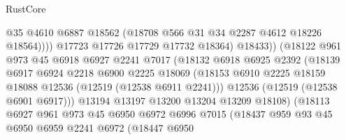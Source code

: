 \begin{lexlean}{RustCore}
\begin{coremodule}
                                        @35
                                        @4610
                                        @6887
                                        @18562
                                        (@18708 @566 @31 @34 @2287 @4612 @18226 @18564))))
                                  @17723
                                  @17726
                                  @17729
                                  @17732
                                  @18364)
                                @18433))
                            (@18122
                              @961
                              @973
                              @45
                              @6918
                              @6927
                              @2241
                              @7017
                              (@18132
                                @6918
                                @6925
                                @2392
                                (@18139
                                  @6917
                                  @6924
                                  @2218
                                  @6900
                                  @2225
                                  @18069
                                  (@18153
                                    @6910
                                    @2225
                                    @18159
                                    @18088
                                    @12536
                                    (@12519 (@12538 @6911 @2241)))
                                  @12536
                                  (@12519 (@12538 @6901 @6917)))
                                @13194
                                @13197
                                @13200
                                @13204
                                @13209
                                @18108)
                              (@18113
                                @6927
                                @961
                                @973
                                @45
                                @6950
                                @6972
                                @6996
                                @7015
                                (@18437
                                  @959
                                  @93
                                  @45
                                  @6950
                                  @6959
                                  @2241
                                  @6972
                                  (@18447
                                    @6950

\end{coremodule}
\end{lexlean}
